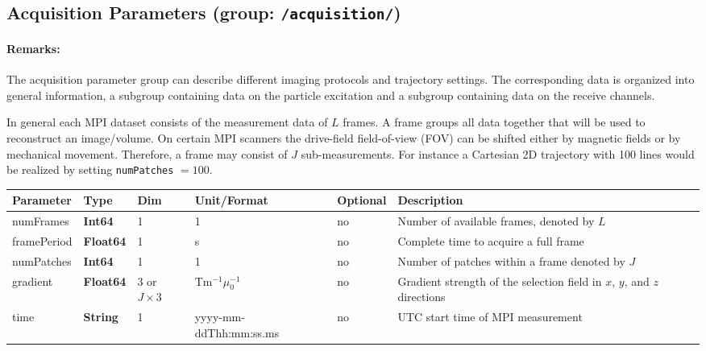 \documentclass[landscape]{article} %
\newcommand{\inl}[1]{\lstinline[columns=fixed]{#1}}
\newcommand{\inltab}[1]{{\ttfamily\bfseries\color{blue}#1}}
\newcommand{\inlvar}[1]{{\ttfamily#1}}
\begin{document}
\newpage
\subsection{Acquisition Parameters (group: \inl{/acquisition/})}

\begin{multicols}{2}

\paragraph{Remarks:} The acquisition parameter group can describe different imaging protocols and trajectory settings. The corresponding data is organized into general information, a subgroup containing data on the particle excitation and a subgroup containing data on the receive channels.

In general each MPI dataset consists of the measurement data of $L$ frames. A frame groups all data together that will be used to reconstruct an image/volume. On certain MPI scanners the drive-field field-of-view (FOV) can be shifted either by magnetic fields or by mechanical movement. Therefore, a frame may consist of $J$ sub-measurements. For instance a Cartesian 2D trajectory with 100 lines would be realized by setting \inl{numPatches} $ = 100$.

\end{multicols}

\noindent \begin{tabularx}{\columnwidth}{lllllX} 
\textbf{Parameter} & \textbf{Type} & \textbf{Dim} & \textbf{Unit/Format} & \textbf{Optional} & \textbf{Description} \\ \hline 
\inlvar{numFrames} & \inltab{Int64} & 1 & 1 & no & Number of available frames, denoted by $L$ \\ \hline
\inlvar{framePeriod} & \inltab{Float64} & 1 & s & no & Complete time to acquire a full frame \\ \hline
\inlvar{numPatches} & \inltab{Int64} & 1 & 1 & no & Number of patches within a frame denoted by $J$ \\ \hline 
\inlvar{gradient} & \inltab{Float64} & 3 or $J \times 3$ & Tm$^{-1}\mu_0^{-1}$ & no & Gradient strength of the selection field in $x$, $y$, and $z$ directions \\ \hline
\inlvar{time} & \inltab{String} & 1 & yyyy-mm-ddThh:mm:ss.ms & no & UTC start time of MPI measurement \\ \hline
\end{tabularx}
\end{document}
